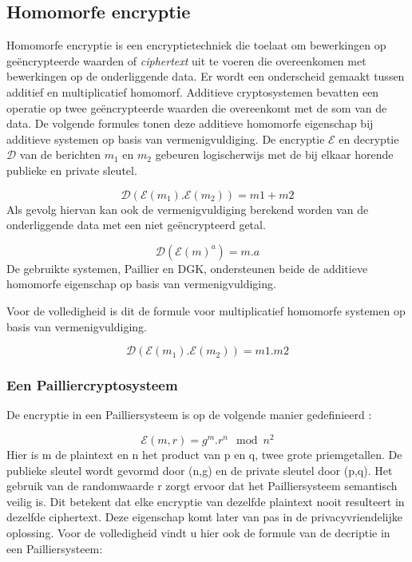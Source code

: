 \subsection{Homomorfe encryptie}
Homomorfe encryptie is een encryptietechniek die toelaat om bewerkingen op ge\"encrypteerde waarden of \emph{ciphertext} uit te voeren die overeenkomen met bewerkingen op de onderliggende data. Er wordt een onderscheid gemaakt tussen additief en multiplicatief homomorf. Additieve cryptosystemen bevatten een operatie op twee ge\"encrypteerde waarden die overeenkomt met de som van de data. De volgende formules \cite{erkin:generating} tonen deze additieve homomorfe eigenschap bij additieve systemen op basis van vermenigvuldiging. De encryptie $\mathcal{E}$ en decryptie $\mathcal{D}$ van de berichten $m_1$ en $m_2$ gebeuren logischerwijs met de bij elkaar horende publieke en private sleutel.

\begin{equation}\label{homoplus}\mathcal{D}(\mathcal{E}(m_1).\mathcal{E}(m_2)) = m1 + m2
\end{equation}
Als gevolg hiervan kan ook de vermenigvuldiging berekend worden van de onderliggende data met een niet ge\"encrypteerd getal.

\begin{equation}\label{homomaal}\mathcal{D}(\mathcal{E}(m)^a) = m.a
\end{equation}
De gebruikte systemen, Paillier en DGK, ondersteunen beide de additieve homomorfe eigenschap op basis van vermenigvuldiging.

Voor de volledigheid is dit de formule voor multiplicatief homomorfe systemen op basis van vermenigvuldiging.

\begin{equation}\mathcal{D}(\mathcal{E}(m_1).\mathcal{E}(m_2)) = m1 . m2
\end{equation}
\subsubsection{Een Pailliercryptosysteem}
\label{paillier}
De encryptie in een Pailliersysteem is op de volgende manier gedefinieerd \cite{erkin:generating}:

\begin{equation}\label{paillierenc}\mathcal{E}(m,r) = g^m.r^n\mod n^2
\end{equation}
Hier is m de plaintext en n het product van p en q, twee grote priemgetallen. De publieke sleutel wordt gevormd door (n,g) en de private sleutel door (p,q). Het gebruik van de randomwaarde r zorgt ervoor dat het Pailliersysteem semantisch veilig is. Dit betekent dat elke encryptie van dezelfde plaintext nooit resulteert in dezelfde ciphertext. Deze eigenschap komt later van pas in de privacyvriendelijke oplossing. Voor de volledigheid vindt u hier ook de formule van de decriptie in een Pailliersysteem:


